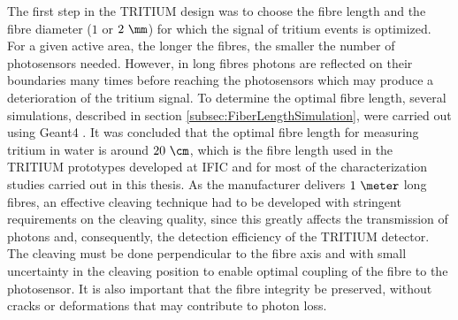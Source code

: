 The first step in the TRITIUM design was to choose the fibre length and the fibre diameter ($1$ or $2~\mm$) for which the signal of tritium events is optimized. For a given active area, the longer the fibres, the smaller the number of photosensors needed. However, in long fibres photons are reflected on their boundaries many times before reaching the photosensors which may produce a deterioration of the tritium signal. To determine the optimal fibre length, several simulations, described in section \ref{subsec:FiberLengthSimulation}, were carried out using Geant4 \cite{Geant4WebPage}. It was concluded that the optimal fibre length for measuring tritium in water is around $20~\cm$, which is the fibre length used in the TRITIUM prototypes developed at IFIC and for most of the characterization studies carried out in this thesis. As the manufacturer \cite{SaintGobain} delivers $1~\meter$ long fibres, an effective cleaving technique had to be developed with stringent requirements on the cleaving quality, since this greatly affects the transmission of photons and, consequently, the detection efficiency of the TRITIUM detector. The cleaving must be done perpendicular to the fibre axis and with small uncertainty in the cleaving position to enable optimal coupling of the fibre to the photosensor. It is also important that the fibre integrity be preserved, without cracks or deformations that may contribute to photon loss. 

